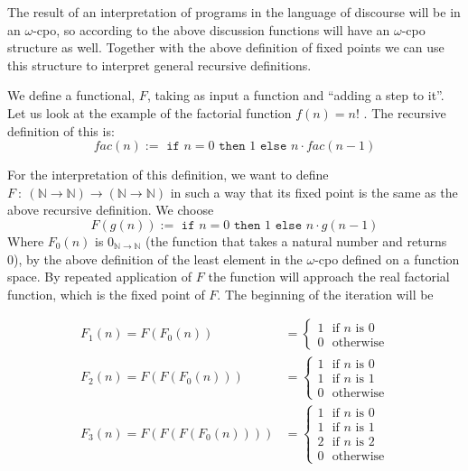 \documentclass[11pt, leqno, titlepage]{article}
\theoremstyle{definition}
\begin{document}
The result of an interpretation of programs in the language of discourse will be in
an $\omega$-cpo, so according to the above discussion functions will have an
$\omega$-cpo structure as well. Together with the above definition of fixed points we
can use this structure to interpret general recursive definitions. 

We define a functional, $F$, taking as input a function and ``adding a step to it''.
Let us look at the example of the factorial function $f(n) = n!$ \cite{haskell}.
The recursive definition of this is:
$$fac(n) := \texttt{ if } n = 0 \texttt{ then }1\texttt{ else } n\cdot fac(n-1)$$

For the interpretation of this definition, we want to define $F~:~(\mathbb{N} \to
\mathbb{N}) \to (\mathbb{N} \to \mathbb{N})$ in such a way that its fixed point is
the same as the above recursive definition. We choose
$$F(g(n)):=\texttt{ if }n=0\texttt{ then }1\texttt{ else }n\cdot g(n-1)$$
Where $F_0(n)$ is $0_{\mathbb{N} \to \mathbb{N}}$ (the function that takes a natural
number and returns 0), by the above definition of the least element in the
$\omega$-cpo defined on a function space. By repeated application of $F$ the function
will approach the real factorial function, which is the fixed point of $F$. The
beginning of the iteration will be

\begin{align*}
  F_1(n) = F(F_0(n)) & = \begin{cases}
                           1~~~\text{if }n\text{ is 0}\\
                           0~~~\text{otherwise}
                         \end{cases}
  \\
  F_2(n) = F(F(F_0(n))) & = \begin{cases}
                             1~~~\text{if }n\text{ is 0}\\
                             1~~~\text{if }n\text{ is 1}\\
                             0~~~\text{otherwise}
                           \end{cases}
  \\
  F_3(n) = F(F(F(F_0(n)))) & = \begin{cases}
                                1~~~\text{if }n\text{ is 0}\\
                                1~~~\text{if }n\text{ is 1}\\
                                2~~~\text{if }n\text{ is 2}\\
                                0~~~\text{otherwise}
                              \end{cases}
\end{align*}
\end{document}
